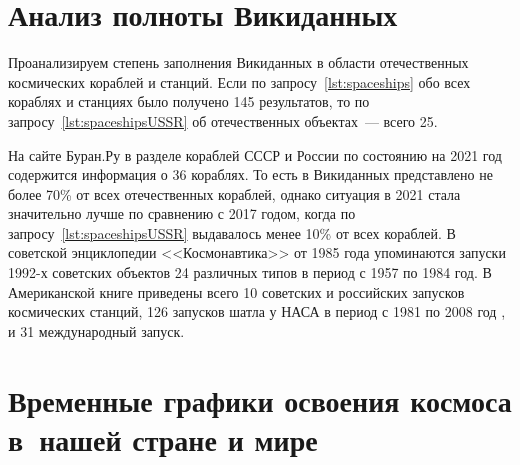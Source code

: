 \section{Анализ полноты Викиданных}

Проанализируем степень заполнения Викиданных в области отечественных космических кораблей и станций. 
Если по запросу~\ref{lst:spaceships} обо всех кораблях и станциях было получено 145 результатов, 
то по запросу~\ref{lst:spaceshipsUSSR} об отечественных объектах~--- всего 25. 

На сайте Буран.Ру в разделе кораблей СССР и России по состоянию на 2021 год содержится информация о 36 кораблях\autocite{spacecraftBuran}. То есть в Викиданных представлено не более 70\% от всех отечественных кораблей, однако ситуация в 2021 стала значительно лучше по сравнению с 2017 годом, когда по запросу~\ref{lst:spaceshipsUSSR} выдавалось менее 10\% от всех кораблей. 
В советской энциклопедии <<Космонавтика>> от 1985 года упоминаются запуски 1992-х советских объектов 24 различных типов в период с 1957 по 1984 год\autocite{spacecraftCosmonavtika}. 
В Американской книге приведены всего 10 советских и российских запусков космических станций\autocite{spacecraftSAA1}, 126 запусков шатла у НАСА в период с 1981 по 2008 год \autocite{spacecraftSAA2}, и 31 международный запуск\autocite{spacecraftSAA3}. 

\section{Временные графики освоения космоса в~нашей стране и мире}

